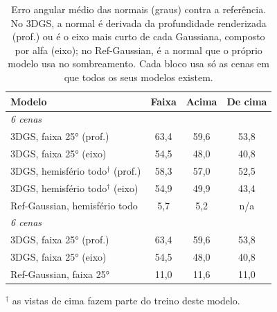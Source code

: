 \begin{table}[t]
\centering
\caption{Erro angular médio das normais (graus) contra a referência. No 3DGS, a normal é derivada da profundidade renderizada (prof.) ou é o eixo mais curto de cada Gaussiana, composto por alfa (eixo); no Ref-Gaussian, é a normal que o próprio modelo usa no sombreamento. Cada bloco usa só as cenas em que todos os seus modelos existem.}
\label{tab:normais25}
\setlength{\tabcolsep}{5pt}
\footnotesize
\begin{tabular}{l ccc}
\toprule
Modelo & Faixa & Acima & De cima \\
\midrule
\multicolumn{4}{l}{\textit{6 cenas}} \\
3DGS, faixa 25° (prof.) & 63{,}4 & 59{,}6 & 53{,}8 \\
3DGS, faixa 25° (eixo) & 54{,}5 & 48{,}0 & 40{,}8 \\
3DGS, hemisfério todo$^\dagger$ (prof.) & 58{,}3 & 57{,}0 & 52{,}5 \\
3DGS, hemisfério todo$^\dagger$ (eixo) & 54{,}9 & 49{,}9 & 43{,}4 \\
Ref-Gaussian, hemisfério todo & 5{,}7 & 5{,}2 & n/a \\
\midrule
\multicolumn{4}{l}{\textit{6 cenas}} \\
3DGS, faixa 25° (prof.) & 63{,}4 & 59{,}6 & 53{,}8 \\
3DGS, faixa 25° (eixo) & 54{,}5 & 48{,}0 & 40{,}8 \\
Ref-Gaussian, faixa 25° & 11{,}0 & 11{,}6 & 11{,}0 \\
\bottomrule
\end{tabular}
\vspace{2pt}
{\scriptsize $^\dagger$ as vistas de cima fazem parte do treino deste modelo.}
\end{table}
